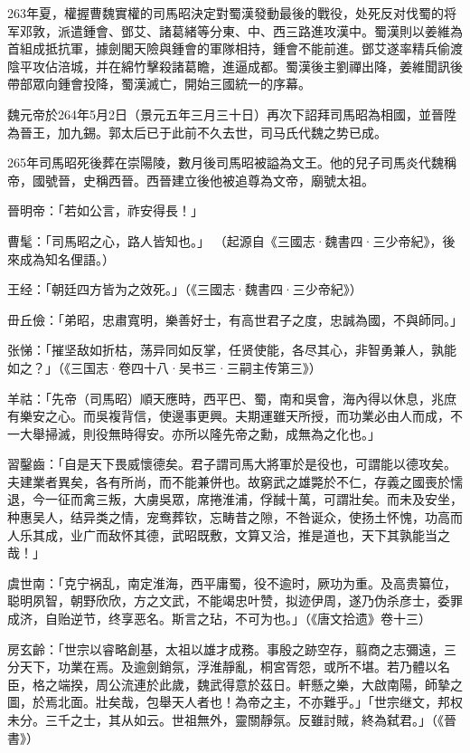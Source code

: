 263年夏，權握曹魏實權的司馬昭決定對蜀漢發動最後的戰役，处死反对伐蜀的将军邓敦，派遣鍾會、鄧艾、諸葛緒等分東、中、西三路進攻漢中。蜀漢則以姜維為首組成抵抗軍，據劍閣天險與鍾會的軍隊相持，鍾會不能前進。鄧艾遂率精兵偷渡陰平攻佔涪城，并在綿竹擊殺諸葛瞻，進逼成都。蜀漢後主劉禪出降，姜維聞訊後帶部眾向鍾會投降，蜀漢滅亡，開始三國統一的序幕。

魏元帝於264年5月2日（景元五年三月三十日）再次下詔拜司馬昭為相國，並晉陞為晉王，加九錫。郭太后已于此前不久去世，司马氏代魏之势已成。

265年司馬昭死後葬在崇陽陵，數月後司馬昭被謚為文王。他的兒子司馬炎代魏稱帝，國號晉，史稱西晉。西晉建立後他被追尊為文帝，廟號太祖。

晉明帝：「若如公言，祚安得長！」

曹髦：「司馬昭之心，路人皆知也。」 （起源自《三國志·魏書四·三少帝紀》，後來成為知名俚語。）

王经：「朝廷四方皆为之效死。」（《三國志·魏書四·三少帝紀》）

毌丘儉：「弟昭，忠肅寬明，樂善好士，有高世君子之度，忠誠為國，不與師同。」

张悌：「摧坚敌如折枯，荡异同如反掌，任贤使能，各尽其心，非智勇兼人，孰能如之？」（《三国志·卷四十八·吴书三·三嗣主传第三》）

羊祜：「先帝（司馬昭）順天應時，西平巴、蜀，南和吳會，海內得以休息，兆庶有樂安之心。而吳複背信，使邊事更興。夫期運雖天所授，而功業必由人而成，不一大舉掃滅，則役無時得安。亦所以隆先帝之勳，成無為之化也。」

習鑿齒：「自是天下畏威懷德矣。君子謂司馬大將軍於是役也，可謂能以德攻矣。夫建業者異矣，各有所尚，而不能兼併也。故窮武之雄斃於不仁，存義之國喪於懦退，今一征而禽三叛，大虜吳眾，席捲淮浦，俘馘十萬，可謂壯矣。而未及安坐，种惠吴人，结异类之情，宠鸯葬钦，忘畴昔之隙，不咎诞众，使扬土怀愧，功高而人乐其成，业广而敌怀其德，武昭既敷，文算又洽，推是道也，天下其孰能当之哉！」　

虞世南：「克宁祸乱，南定淮海，西平庸蜀，役不逾时，厥功为重。及高贵纂位，聪明夙智，朝野欣欣，方之文武，不能竭忠叶赞，拟迹伊周，遂乃伪杀彦士，委罪成济，自贻逆节，终享恶名。斯言之玷，不可为也。」（《唐文拾遗》卷十三）

房玄齡：「世宗以睿略創基，太祖以雄才成務。事殷之跡空存，翦商之志彌遠，三分天下，功業在焉。及逾劍銷氛，浮淮靜亂，桐宮胥怨，或所不堪。若乃體以名臣，格之端揆，周公流連於此歲，魏武得意於茲日。軒懸之樂，大啟南陽，師摯之圖，於焉北面。壯矣哉，包舉天人者也！為帝之主，不亦難乎。」「世宗继文，邦权未分。三千之士，其从如云。世祖無外，靈關靜氛。反雖討賊，終為弑君。」（《晉書》）

